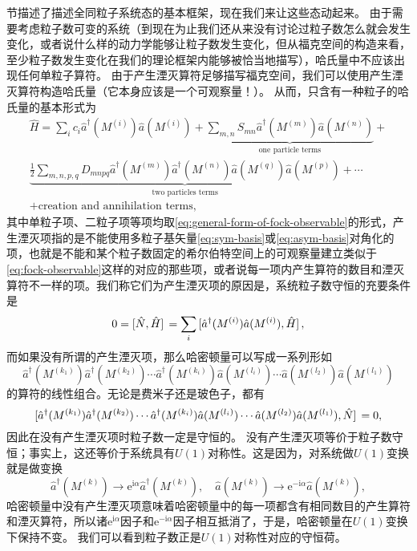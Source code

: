 \documentclass[hyperref, UTF8, a4paper]{ctexart}
\newcommand*{\ii}{\mathrm{i}}
\newcommand*{\ee}{\mathrm{e}}
\renewcommand{\autoref}{\prettyref}
\begin{document}
\autoref{sec:many-body-state}节描述了描述全同粒子系统态的基本框架，现在我们来让这些态动起来。
由于需要考虑粒子数可变的系统（到现在为止我们还从来没有讨论过粒子数怎么就会发生变化，或者说什么样的动力学能够让粒子数发生变化，但从福克空间的构造来看，至少粒子数发生变化在我们的理论框架内能够被恰当地描写），哈氏量中不应该出现任何单粒子算符。
由于产生湮灭算符足够描写福克空间，我们可以使用产生湮灭算符构造哈氏量（它本身应该是一个可观察量！）。
从而，只含有一种粒子的哈氏量的基本形式为
\begin{equation}
    \begin{split}
        \hat{H} = \sum_i c_i \hat{a}^\dagger (M^{(i)}) \hat{a} (M^{(i)}) + \underbrace{\sum_{m, n} S_{mn} \hat{a}^\dagger (M^{(m)}) \hat{a} (M^{(n)}) }_\text{one particle terms} + \\
        \underbrace{\frac{1}{2} \sum_{m, n, p, q} D_{mnpq} \hat{a}^\dagger (M^{(m)}) \hat{a}^\dagger (M^{(n)}) \hat{a} (M^{(q)}) \hat{a} (M^{(p)}) }_\text{two particles terms} + \cdots \\
        + \text{creation and annihilation terms},
    \end{split}
    \label{eq:one-kind-many-body-hamitonian}
\end{equation}
其中单粒子项、二粒子项等项均取\eqref{eq:general-form-of-fock-observable}的形式，产生湮灭项指的是不能使用多粒子基矢量\eqref{eq:sym-basis}或\eqref{eq:asym-basis}对角化的项，也就是不能和某个粒子数固定的希尔伯特空间上的可观察量建立类似于\eqref{eq:fock-observable}这样的对应的那些项，或者说每一项内产生算符的数目和湮灭算符不一样的项。我们称它们为产生湮灭项的原因是，系统粒子数守恒的充要条件是
\begin{equation}
    0 = \comm*{\hat{N}}{\hat{H}} = \sum_i \comm*{\hat{a}^\dagger (M^{(i)}) \hat{a} (M^{(i)})}{\hat{H}},
\end{equation}
而如果没有所谓的产生湮灭项，那么哈密顿量可以写成一系列形如
\[
    \hat{a}^\dagger (M^{(k_1)}) \hat{a}^\dagger (M^{(k_2)}) \cdots \hat{a}^\dagger (M^{(k_i)}) \hat{a} (M^{(l_i)}) \cdots \hat{a} (M^{(l_2)}) \hat{a} (M^{(l_1)})
\]
的算符的线性组合。无论是费米子还是玻色子，都有
\[
    \comm*{\hat{a}^\dagger (M^{(k_1)}) \hat{a}^\dagger (M^{(k_2)}) \cdots \hat{a}^\dagger (M^{(k_i)}) \hat{a} (M^{(l_i)}) \cdots \hat{a} (M^{(l_2)}) \hat{a} (M^{(l_1)})}{\hat{N}} = 0,
\]
因此在没有产生湮灭项时粒子数一定是守恒的。
没有产生湮灭项等价于粒子数守恒；事实上，这还等价于系统具有$U(1)$对称性。这是因为，对系统做$U(1)$变换就是做变换
\[
    \hat{a}^\dagger(M^{(k)}) \longrightarrow \ee^{\ii \alpha} \hat{a}^\dagger(M^{(k)}), \quad \hat{a}(M^{(k)}) \longrightarrow \ee^{-\ii \alpha} \hat{a}(M^{(k)}),
\]
哈密顿量中没有产生湮灭项意味着哈密顿量中的每一项都含有相同数目的产生算符和湮灭算符，所以诸$\ee^{\ii \alpha}$因子和$\ee^{-\ii \alpha}$因子相互抵消了，于是，哈密顿量在$U(1)$变换下保持不变。
我们可以看到粒子数正是$U(1)$对称性对应的守恒荷。
\end{document}
